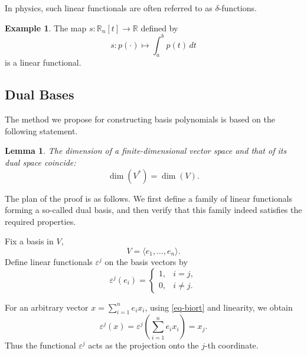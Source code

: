 \documentclass{article}
\newtheorem{lemma}[theorem]{Lemma}  	%
\theoremstyle{definition}
\newtheorem{example}[theorem]{Example}
\theoremstyle{definition}
\numberwithin{figure}{section}
\newcommand{\1}{\mathbf{1}}
\begin{document}
In physics, such linear functionals are often referred to as $\delta$-functions.

\begin{example}\label{ex-int}
The map $s: \mathbb{R}_n[t] \to \mathbb{R}$ defined by
\[
    s: p(\cdot) \mapsto \int_a^b p(t)\,dt
\]
is a linear functional.
\end{example}

\subsection{Dual Bases}

The method we propose for constructing basis polynomials is based on the following statement.

\begin{lemma}\label{lemmaV=V*}
The dimension of a finite-dimensional vector space and that of its dual space coincide:
\[
    \dim(V^*) = \dim(V).
\]
\end{lemma}

The plan of the proof is as follows. We first define a family of linear functionals forming a so-called dual basis, and then verify that this family indeed satisfies the required properties.

Fix a basis in $V$,
\[
    V = \langle e_1, \ldots, e_n \rangle.
\]
Define linear functionals $\varepsilon^j$ on the basis vectors by
\begin{equation}\label{eq-biort}
    \varepsilon^j(e_i) =
    \begin{cases}
        1, & i = j,\\[2pt]
        0, & i \neq j.
    \end{cases}
\end{equation}

For an arbitrary vector $x = \sum_{i=1}^n e_i x_i$, using \eqref{eq-biort} and linearity, we obtain
\[
    \varepsilon^j(x)
    = \varepsilon^j\!\left(\sum_{i=1}^n e_i x_i\right)
    = x_j.
\]
Thus the functional $\varepsilon^j$ acts as the projection onto the $j$-th coordinate.
\end{document}
